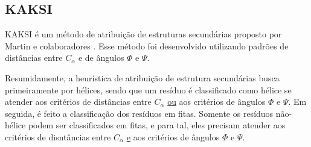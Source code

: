 \subsection{KAKSI}

KAKSI é um método de atribuição de estruturas secundárias proposto por Martin e colaboradores \citeyear{Martin2005}. Esse método foi desenvolvido utilizando padrões de distâncias entre $C_\alpha$ e de ângulos $\Phi$ e $\Psi$.

Resumidamente, a heurística de atribuição de estrutura secundárias busca primeiramente por hélices, sendo que um resíduo é classificado como hélice se atender aos critérios de distâncias entre $C_\alpha$ \underline{ou} aos critérios de ângulos $\Phi$ e $\Psi$. Em seguida, é feito a classificação dos resíduos em fitas. Somente os resíduos não-hélice podem ser classificados em fitas, e para tal, eles precisam atender aos critérios de disntâncias entre $C_\alpha$ \underline{e} aos critérios de ângulos $\Phi$ e $\Psi$.

